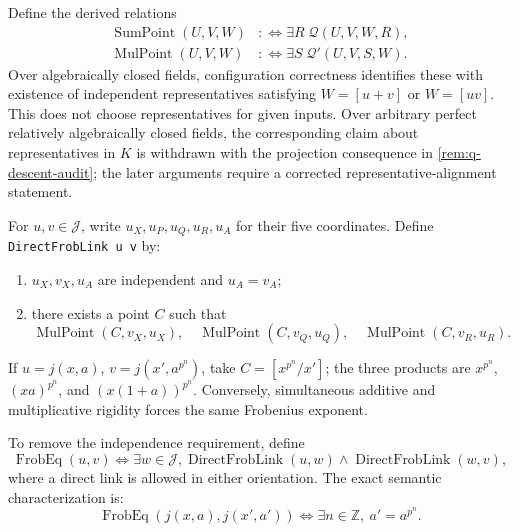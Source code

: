 \documentclass[11pt,oneside]{article}
\theoremstyle{definition}
\theoremstyle{remark}
\newcommand{\Qrel}{\mathcal{Q}}
\newcommand{\Qprel}{\mathcal{Q}'}
\newcommand{\Jrel}{\mathcal{J}}
\newcommand{\lean}[1]{\nolinkurl{#1}}
\begin{document}
Define the derived relations
\[
\begin{aligned}
\operatorname{SumPoint}(U,V,W)&:\Longleftrightarrow
  \exists R\;\Qrel(U,V,W,R),\\
\operatorname{MulPoint}(U,V,W)&:\Longleftrightarrow
  \exists S\;\Qprel(U,V,S,W).
\end{aligned}
\]
Over algebraically closed fields, configuration correctness identifies these with
existence of independent representatives satisfying $W=[u+v]$ or $W=[uv]$.  This does not
choose representatives for given inputs.  Over arbitrary perfect relatively
algebraically closed fields, the corresponding claim about representatives in $K$ is
withdrawn with the projection consequence in \cref{rem:q-descent-audit}; the later
arguments require a corrected representative-alignment statement.

For $u,v\in\Jrel$, write $u_X,u_P,u_Q,u_R,u_A$ for their five coordinates.  Define
\lean{DirectFrobLink u v} by:

\begin{enumerate}[label=(\alph*),leftmargin=10mm]
\item $u_X,v_X,u_A$ are independent and $u_A=v_A$;
\item there exists a point $C$ such that
\[
 \operatorname{MulPoint}(C,v_X,u_X),\quad
 \operatorname{MulPoint}(C,v_Q,u_Q),\quad
 \operatorname{MulPoint}(C,v_R,u_R).
\]
\end{enumerate}

If $u=j(x,a)$, $v=j(x',a^{p^n})$, take $C=[x^{p^n}/x']$; the three products are
$x^{p^n}$, $(xa)^{p^n}$, and $(x(1+a))^{p^n}$.  Conversely, simultaneous additive and
multiplicative rigidity forces the same Frobenius exponent.

To remove the independence requirement, define
\[
 \operatorname{FrobEq}(u,v)\Longleftrightarrow
 \exists w\in\Jrel,
 \operatorname{DirectFrobLink}(u,w)\land
 \operatorname{DirectFrobLink}(w,v),
\]
where a direct link is allowed in either orientation.  The exact semantic characterization
is:
\[
 \operatorname{FrobEq}(j(x,a),j(x',a'))
 \Longleftrightarrow
 \exists n\in\mathbb Z,\ a'=a^{p^n}.
\]
\end{document}
